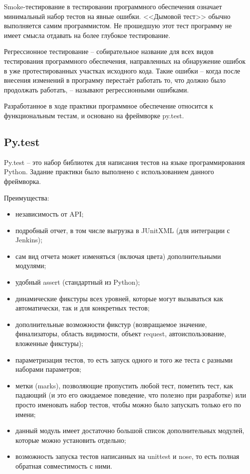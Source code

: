 Smoke-тестирование в тестировании программного обеспечения означает минимальный набор тестов на явные ошибки. <<Дымовой тест>> обычно выполняется самим программистом. Не прошедшую этот тест программу не имеет смысла отдавать на более глубокое тестирование.\par

Регрессионное тестирование -- собирательное название для всех видов тестирования программного обеспечения, направленных на обнаружение ошибок в уже протестированных участках исходного кода. Такие ошибки -- когда после внесения изменений в программу перестаёт работать то, что должно было продолжать работать, -- называют регрессионными ошибками.\par

Разработанное в ходе практики программное обеспечение относится к функциональным тестам, и основано на фреймворке py.test.\\

\subsection{Py.test}
Py.test -- это набор библиотек для написания тестов на языке программирования Python. Задание практики было выполнено с использованием данного фреймворка.\par

Преимущества:
\begin{itemize}
    \item независимость от API;
    \item подробный отчет, в том числе выгрузка в JUnitXML (для интеграции с Jenkins);
    \item сам вид отчета может изменяться (включая цвета) дополнительными модулями;
    \item удобный assert (стандартный из Python);
    \item динамические фикстуры всех уровней, которые могут вызываться как автоматически, так и для конкретных тестов;
    \item дополнительные возможности фикстур (возвращаемое значение, финализаторы, область видимости, объект request, автоиспользование, вложенные фикстуры);
    \item параметризация тестов, то есть запуск одного и того же теста с разными наборами параметров;
    \item метки (marks), позволяющие пропустить любой тест, пометить тест, как падающий (и это его ожидаемое поведение, что полезно при разработке) или просто именовать набор тестов, чтобы можно было запускать только его по имени;
    \item данный модуль имеет достаточно большой список дополнительных модулей, которые можно установить отдельно;
    \item возможность запуска тестов написанных на unittest и nose, то есть полная обратная совместимость с ними.
\end{itemize}

